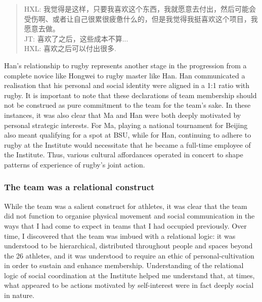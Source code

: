 \begin{CJK}{UTF8}{gbsn}
          \begin{quote}
            HXL: 我觉得是这样，只要我喜欢这个东西，我就愿意去付出，然后可能会受伤啊、或者让自己很累很疲惫什么的，但是我觉得我挺喜欢这个项目，我愿意去做。\\
            JT: 喜欢了之后，这些成本不算...\\
            HXL: 喜欢之后可以付出很多.
          \end{quote}
Han's relationship to rugby represents another stage in the progression from a complete novice like Hongwei to rugby master like Han.  Han communicated a realisation that his personal and social identity were aligned in a 1:1 ratio with rugby.  It is important to note that these declarations of team membership should not be construed as pure commitment to the team for the team's sake.  In these instances, it was also clear that Ma and Han were both deeply motivated by personal strategic interests.  For Ma, playing a national tournament for Beijing also meant qualifying for a spot at BSU, while for Han, continuing to adhere to rugby at the Institute would necessitate that he became a full-time employee of the Institute.  Thus, various cultural affordances operated in concert to shape patterns of experience of rugby's joint action.



\subsubsection{The team was a relational construct}
While the team was a salient construct for athletes, it was clear that the team did not function to organise physical movement and social communication in the ways that I had come to expect in teams that I had occupied previously.  Over time, I discovered that the team was imbued with a relational logic: it was understood to be hierarchical, distributed throughout people and spaces beyond the 26 athletes, and it was understood to require an ethic of personal-cultivation in order to sustain and enhance membership.  Understanding of the relational logic of social coordination at the Institute helped me understand that, at times, what appeared to be actions motivated by self-interest were in fact deeply social in nature.


\end{CJK}
